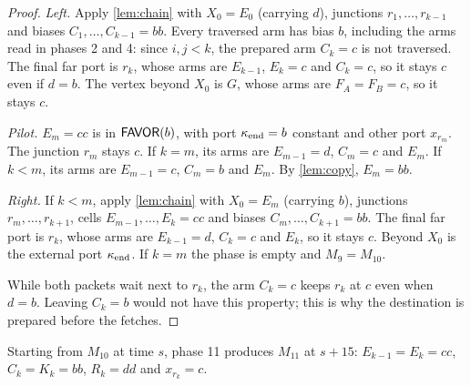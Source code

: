 \begin{proof}
\emph{Left.} Apply \cref{lem:chain} with $X_0=E_0$ (carrying $d$), junctions $r_1,\dots,r_{k-1}$ and
biases $C_1,\dots,C_{k-1}=bb$. Every traversed arm has bias $b$, including the arms read in phases 2
and 4: since $i,j<k$, the prepared arm $C_k=c$ is not traversed. The final far port is $r_k$, whose
arms are $E_{k-1}$, $E_k=c$ and $C_k=c$, so it stays $c$ even if $d=b$. The vertex beyond $X_0$ is
$G$, whose arms are $F_A=F_B=c$, so it stays $c$.

\emph{Pilot.} $E_m=cc$ is in $\textsf{FAVOR}(b)$, with port $\kappa_{\mathrm{end}}=b$ constant and other port $x_{r_m}$. The
junction $r_m$ stays $c$. If $k=m$, its arms are $E_{m-1}=d$, $C_m=c$ and $E_m$. If $k<m$, its arms
are $E_{m-1}=c$, $C_m=b$ and $E_m$. By \cref{lem:copy}, $E_m=bb$.

\emph{Right.} If $k<m$, apply \cref{lem:chain} with $X_0=E_m$ (carrying $b$), junctions
$r_m,\dots,r_{k+1}$, cells $E_{m-1},\dots,E_k=cc$ and biases $C_m,\dots,C_{k+1}=bb$. The final far port
is $r_k$, whose arms are $E_{k-1}=d$, $C_k=c$ and $E_k$, so it stays $c$. Beyond $X_0$ is the
external port $\kappa_{\mathrm{end}}$. If $k=m$ the phase is empty and $M_9=M_{10}$.

While both packets wait next to $r_k$, the arm $C_k=c$ keeps $r_k$ at $c$ even when $d=b$. Leaving
$C_k=b$ would not have this property; this is why the destination is prepared before the fetches.
\end{proof}

\begin{lemma}\label{lem:commit}
Starting from $M_{10}$ at time $s$, phase 11 produces $M_{11}$ at $s+15$: $E_{k-1}=E_k=cc$,
$C_k=K_k=bb$, $R_k=dd$ and $x_{r_k}=c$.
\end{lemma}


